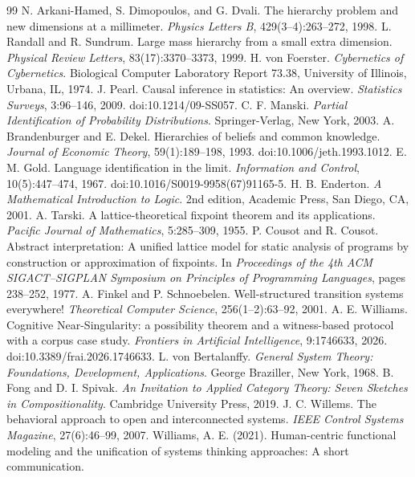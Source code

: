 \documentclass[11pt]{article}
\theoremstyle{definition}
\begin{document}
\begin{thebibliography}{99}
 N. Arkani-Hamed, S. Dimopoulos, and G. Dvali. The hierarchy problem and new dimensions at a millimeter. \emph{Physics Letters B}, 429(3--4):263--272, 1998.
 L. Randall and R. Sundrum. Large mass hierarchy from a small extra dimension. \emph{Physical Review Letters}, 83(17):3370--3373, 1999.
 H. von Foerster. \emph{Cybernetics of Cybernetics}. Biological Computer Laboratory Report 73.38, University of Illinois, Urbana, IL, 1974.
 J. Pearl. Causal inference in statistics: An overview. \emph{Statistics Surveys}, 3:96--146, 2009. doi:10.1214/09-SS057.
 C. F. Manski. \emph{Partial Identification of Probability Distributions}. Springer-Verlag, New York, 2003.
 A. Brandenburger and E. Dekel. Hierarchies of beliefs and common knowledge. \emph{Journal of Economic Theory}, 59(1):189--198, 1993. doi:10.1006/jeth.1993.1012.
 E. M. Gold. Language identification in the limit. \emph{Information and Control}, 10(5):447--474, 1967. doi:10.1016/S0019-9958(67)91165-5.
 H. B. Enderton. \emph{A Mathematical Introduction to Logic}. 2nd edition, Academic Press, San Diego, CA, 2001.
 A. Tarski. A lattice-theoretical fixpoint theorem and its applications. \emph{Pacific Journal of Mathematics}, 5:285--309, 1955.
 P. Cousot and R. Cousot. Abstract interpretation: A unified lattice model for static analysis of programs by construction or approximation of fixpoints. In \emph{Proceedings of the 4th ACM SIGACT--SIGPLAN Symposium on Principles of Programming Languages}, pages 238--252, 1977.
 A. Finkel and P. Schnoebelen. Well-structured transition systems everywhere! \emph{Theoretical Computer Science}, 256(1--2):63--92, 2001.
 A. E. Williams. Cognitive Near-Singularity: a possibility theorem and a witness-based protocol with a corpus case study. \emph{Frontiers in Artificial Intelligence}, 9:1746633, 2026. doi:10.3389/frai.2026.1746633.
 L. von Bertalanffy. \emph{General System Theory: Foundations, Development, Applications}. George Braziller, New York, 1968.
 B. Fong and D. I. Spivak. \emph{An Invitation to Applied Category Theory: Seven Sketches in Compositionality}. Cambridge University Press, 2019.
 J. C. Willems. The behavioral approach to open and interconnected systems. \emph{IEEE Control Systems Magazine}, 27(6):46--99, 2007.
Williams, A. E. (2021). 
Human-centric functional modeling and the unification of systems thinking approaches: A short communication. 

\end{thebibliography}
\end{document}
